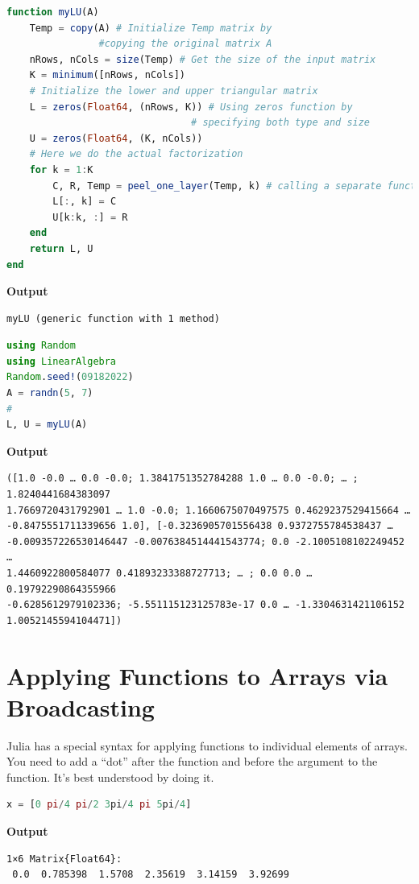 \begin{lstlisting}[language=Julia,style=mystyle]
function myLU(A)
    Temp = copy(A) # Initialize Temp matrix by 
                #copying the original matrix A
    nRows, nCols = size(Temp) # Get the size of the input matrix
    K = minimum([nRows, nCols])
    # Initialize the lower and upper triangular matrix
    L = zeros(Float64, (nRows, K)) # Using zeros function by
                                # specifying both type and size
    U = zeros(Float64, (K, nCols)) 
    # Here we do the actual factorization
    for k = 1:K
        C, R, Temp = peel_one_layer(Temp, k) # calling a separate function
        L[:, k] = C
        U[k:k, :] = R
    end
    return L, U
end
\end{lstlisting}
\textbf{Output} 
\begin{verbatim}
myLU (generic function with 1 method)
\end{verbatim}

\begin{lstlisting}[language=Julia,style=mystyle]
using Random
using LinearAlgebra
Random.seed!(09182022)
A = randn(5, 7)
#
L, U = myLU(A)
\end{lstlisting}
\textbf{Output} 
\begin{verbatim}
([1.0 -0.0 … 0.0 -0.0; 1.3841751352784288 1.0 … 0.0 -0.0; … ; 1.8240441684383097 
1.7669720431792901 … 1.0 -0.0; 1.1660675070497575 0.4629237529415664 … 
-0.8475551711339656 1.0], [-0.3236905701556438 0.9372755784538437 … 
-0.009357226530146447 -0.0076384514441543774; 0.0 -2.1005108102249452 …
1.4460922800584077 0.41893233388727713; … ; 0.0 0.0 … 0.19792290864355966 
-0.6285612979102336; -5.551115123125783e-17 0.0 … -1.3304631421106152 
1.0052145594104471])
\end{verbatim}

\section{Applying Functions to Arrays via Broadcasting}

Julia has a special syntax for applying functions to individual elements of arrays. You need to add a ``dot'' after the function and before the argument to the function. It's best understood by doing it. 

\begin{lstlisting}[language=Julia,style=mystyle]
x = [0 pi/4 pi/2 3pi/4 pi 5pi/4]
\end{lstlisting}
\textbf{Output} 
\begin{verbatim}
1×6 Matrix{Float64}:
 0.0  0.785398  1.5708  2.35619  3.14159  3.92699
\end{verbatim}

